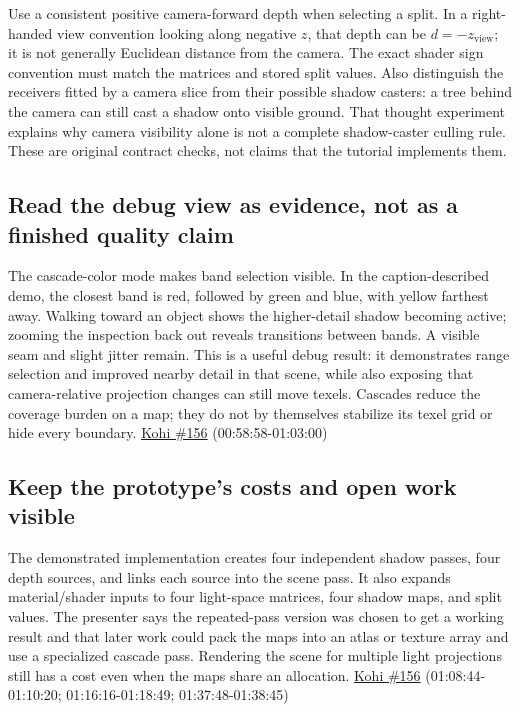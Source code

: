 Use a consistent positive camera-forward depth when selecting a split. In a right-handed view convention looking along negative \(z\), that depth can be \(d=-z_{\mathrm{view}}\); it is not generally Euclidean distance from the camera. The exact shader sign convention must match the matrices and stored split values. Also distinguish the receivers fitted by a camera slice from their possible shadow casters: a tree behind the camera can still cast a shadow onto visible ground. That thought experiment explains why camera visibility alone is not a complete shadow-caster culling rule. These are original contract checks, not claims that the tutorial implements them.

\subsection{Read the debug view as evidence, not as a finished quality claim}\label{06-engine-ii-ch026-read-the-debug-view-as-evidence-not-as-a-finished-quality-claim}

\hypertarget{06-engine-ii-ch026-read-the-debug-view-as-evidence-not-as-a-finished-quality-claim}{}

The cascade-color mode makes band selection visible. In the caption-described demo, the closest band is red, followed by green and blue, with yellow farthest away. Walking toward an object shows the higher-detail shadow becoming active; zooming the inspection back out reveals transitions between bands. A visible seam and slight jitter remain. This is a useful debug result: it demonstrates range selection and improved nearby detail in that scene, while also exposing that camera-relative projection changes can still move texels. Cascades reduce the coverage burden on a map; they do not by themselves stabilize its texel grid or hide every boundary. \href{https://www.youtube.com/watch?v=coWS_saBPBk}{Kohi \#156} (00:58:58-01:03:00)

\subsection{Keep the prototype's costs and open work visible}\label{06-engine-ii-ch026-keep-the-prototypes-costs-and-open-work-visible}

\hypertarget{06-engine-ii-ch026-keep-the-prototypes-costs-and-open-work-visible}{}

The demonstrated implementation creates four independent shadow passes, four depth sources, and links each source into the scene pass. It also expands material/shader inputs to four light-space matrices, four shadow maps, and split values. The presenter says the repeated-pass version was chosen to get a working result and that later work could pack the maps into an atlas or texture array and use a specialized cascade pass. Rendering the scene for multiple light projections still has a cost even when the maps share an allocation. \href{https://www.youtube.com/watch?v=coWS_saBPBk}{Kohi \#156} (01:08:44-01:10:20; 01:16:16-01:18:49; 01:37:48-01:38:45)

